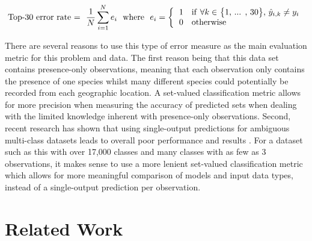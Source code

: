 \documentclass[12pt, oneside]{article}
\begin{document}
\begin{normalsize}
\[ 
\textnormal{Top-30 error rate = } \ \frac{1}{N} \sum\limits_{i=1}^N e_{i} \ \ \textnormal{where} \ \ e_{i} = 
\bigg\{
	  \begin{tabular}{l}
	  1 \ \ \textnormal{if} $\forall k \in$ \big\{1, ... , 30\big\}, $\hat{y}_{i,k} \neq y_{i}$ \\
	  0 \ \ \textnormal{otherwise} \\
	  \end{tabular}
\] 

There are several reasons to use this type of error measure as the main evaluation metric for this problem and data. The first reason being that this data set contains presence-only observations, meaning that each observation only contains the presence of one species whilst many different species could potentially be recorded from each geographic location. A set-valued classification metric allows for more precision when measuring the accuracy of predicted sets when dealing with the limited knowledge inherent with presence-only observations. Second, recent research has shown that using single-output predictions for ambiguous multi-class datasets leads to overall poor performance and results \cite{chzhen2021set}. For a dataset such as this with over 17,000 classes and many classes with as few as 3 observations, it makes sense to use a more lenient set-valued classification metric which allows for more meaningful comparison of models and input data types, instead of a single-output prediction per observation.

\end{normalsize}

\section{Related Work}
\label{Related Work}
\end{document}
